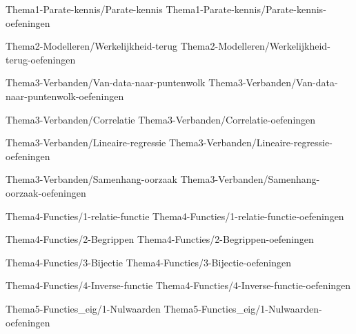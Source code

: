 %








  {Thema1-Parate-kennis/Parate-kennis}
  {Thema1-Parate-kennis/Parate-kennis-oefeningen}


  \FVDchapterpair
    {Thema2-Modelleren/Werkelijkheid-terug}
    {Thema2-Modelleren/Werkelijkheid-terug-oefeningen}


  \FVDchapterpair
  {Thema3-Verbanden/Van-data-naar-puntenwolk}
  {Thema3-Verbanden/Van-data-naar-puntenwolk-oefeningen}

\FVDchapterpair
  {Thema3-Verbanden/Correlatie}
  {Thema3-Verbanden/Correlatie-oefeningen}

\FVDchapterpair
  {Thema3-Verbanden/Lineaire-regressie}
  {Thema3-Verbanden/Lineaire-regressie-oefeningen}

\FVDchapterpair
  {Thema3-Verbanden/Samenhang-oorzaak}
  {Thema3-Verbanden/Samenhang-oorzaak-oefeningen}
  


  \FVDchapterpair
  {Thema4-Functies/1-relatie-functie}
  {Thema4-Functies/1-relatie-functie-oefeningen}

\FVDchapterpair
  {Thema4-Functies/2-Begrippen}
  {Thema4-Functies/2-Begrippen-oefeningen}

\FVDchapterpair
  {Thema4-Functies/3-Bijectie}
  {Thema4-Functies/3-Bijectie-oefeningen}

\FVDchapterpair
  {Thema4-Functies/4-Inverse-functie}
  {Thema4-Functies/4-Inverse-functie-oefeningen}
  

  \FVDchapterpair
  {Thema5-Functies_eig/1-Nulwaarden}
  {Thema5-Functies_eig/1-Nulwaarden-oefeningen}
  
